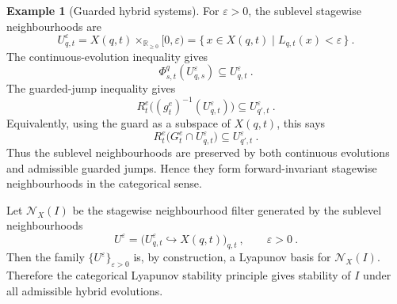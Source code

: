 \documentclass[a4paper,reqno,oneside]{amsart}
\theoremstyle{definition}
\newtheorem{example}[theorem]{Example}
\theoremstyle{remark}
\numberwithin{equation}{section}
\begin{document}
\begin{example}[Guarded hybrid systems]
For $\varepsilon>0$, the sublevel stagewise neighbourhoods are
\begin{equation}
    U^\varepsilon_{q,t}
    =
    X(q,t)\times_{\mathbb R_{\geq 0}}[0,\varepsilon)
    =
    \{\,x\in X(q,t)\mid L_{q,t}(x)<\varepsilon\,\} \ .
\end{equation}
The continuous-evolution inequality gives
\begin{equation}
    \Phi^q_{s,t}(U^\varepsilon_{q,s})
    \subseteq
    U^\varepsilon_{q,t} \ .
\end{equation}
The guarded-jump inequality gives
\begin{equation}
    R^e_t
    \bigl(
        (g^e_t)^{-1}(U^\varepsilon_{q,t})
    \bigr)
    \subseteq
    U^\varepsilon_{q',t} \ .
\end{equation}
Equivalently, using the guard as a subspace of $X(q,t)$, this says
\begin{equation}
    R^e_t
    \bigl(
        G^e_t\cap U^\varepsilon_{q,t}
    \bigr)
    \subseteq
    U^\varepsilon_{q',t} \ .
\end{equation}
Thus the sublevel neighbourhoods are preserved by both continuous evolutions
and admissible guarded jumps. Hence they form forward-invariant stagewise
neighbourhoods in the categorical sense.

Let $\mathcal N_X(I)$ be the stagewise neighbourhood filter generated by the
sublevel neighbourhoods
\begin{equation}
    U^\varepsilon=
    \bigl(U^\varepsilon_{q,t}\hookrightarrow X(q,t)\bigr)_{q,t} \ ,
    \qquad
    \varepsilon>0 \ .
\end{equation}
Then the family $\{U^\varepsilon\}_{\varepsilon>0}$ is, by construction, a Lyapunov basis for $\mathcal N_X(I)$. Therefore the
categorical Lyapunov stability principle gives stability of $I$ under all
admissible hybrid evolutions.


\end{example}
\end{document}
